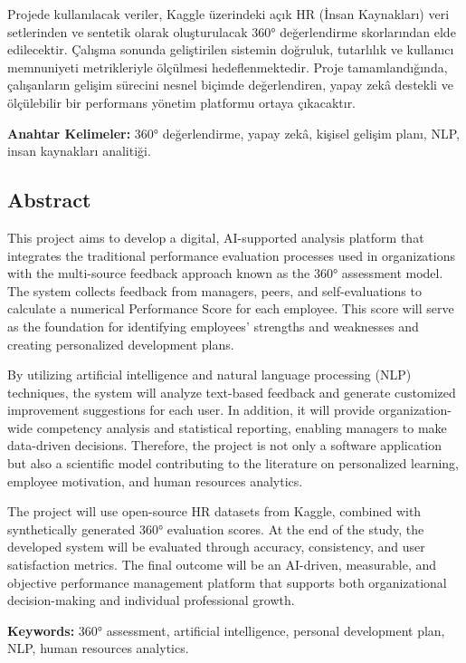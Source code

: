 \documentclass[a4paper,12pt]{article}
\begin{document}
Projede kullanılacak veriler, Kaggle üzerindeki açık HR (İnsan Kaynakları) veri setlerinden ve sentetik olarak oluşturulacak 360° değerlendirme skorlarından elde edilecektir. Çalışma sonunda geliştirilen sistemin doğruluk, tutarlılık ve kullanıcı memnuniyeti metrikleriyle ölçülmesi hedeflenmektedir. Proje tamamlandığında, çalışanların gelişim sürecini nesnel biçimde değerlendiren, yapay zekâ destekli ve ölçülebilir bir performans yönetim platformu ortaya çıkacaktır.  

\vspace{0.5cm}
\noindent \textbf{Anahtar Kelimeler:} 360° değerlendirme, yapay zekâ, kişisel gelişim planı, NLP, insan kaynakları analitiği.


\subsection*{Abstract}
\noindent
This project aims to develop a digital, AI-supported analysis platform that integrates the traditional performance evaluation processes used in organizations with the multi-source feedback approach known as the 360° assessment model. The system collects feedback from managers, peers, and self-evaluations to calculate a numerical Performance Score for each employee. This score will serve as the foundation for identifying employees’ strengths and weaknesses and creating personalized development plans.  

By utilizing artificial intelligence and natural language processing (NLP) techniques, the system will analyze text-based feedback and generate customized improvement suggestions for each user. In addition, it will provide organization-wide competency analysis and statistical reporting, enabling managers to make data-driven decisions. Therefore, the project is not only a software application but also a scientific model contributing to the literature on personalized learning, employee motivation, and human resources analytics.  

The project will use open-source HR datasets from Kaggle, combined with synthetically generated 360° evaluation scores. At the end of the study, the developed system will be evaluated through accuracy, consistency, and user satisfaction metrics. The final outcome will be an AI-driven, measurable, and objective performance management platform that supports both organizational decision-making and individual professional growth.  

\vspace{0.5cm}
\noindent \textbf{Keywords:} 360° assessment, artificial intelligence, personal development plan, NLP, human resources analytics.
\end{document}
